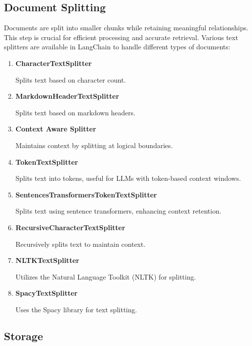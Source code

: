 \documentclass{article}
\begin{document}
\bigskip
\bigskip

\subsection{Document Splitting}

Documents are split into smaller chunks while retaining meaningful relationships. This step is crucial for efficient processing and accurate retrieval. Various text splitters are available in LangChain to handle different types of documents:

\begin{enumerate}[label=\textbf{\arabic*.}, left=0pt, align=left, itemindent=*]
    \item \textbf{CharacterTextSplitter}

    Splits text based on character count.

    \item \textbf{MarkdownHeaderTextSplitter}

    Splits text based on markdown headers.

    \item \textbf{Context Aware Splitter}

    Maintains context by splitting at logical boundaries.

    \item \textbf{TokenTextSplitter}

    Splits text into tokens, useful for LLMs with token-based context windows.

    \item \textbf{SentencesTransformersTokenTextSplitter}

    Splits text using sentence transformers, enhancing context retention.

    \item \textbf{RecursiveCharacterTextSplitter}

    Recursively splits text to maintain context.

    \item \textbf{NLTKTextSplitter}

    Utilizes the Natural Language Toolkit (NLTK) for splitting.

    \item \textbf{SpacyTextSplitter}

    Uses the Spacy library for text splitting.
\end{enumerate}

\pagebreak

\subsection{Storage}
\end{document}
